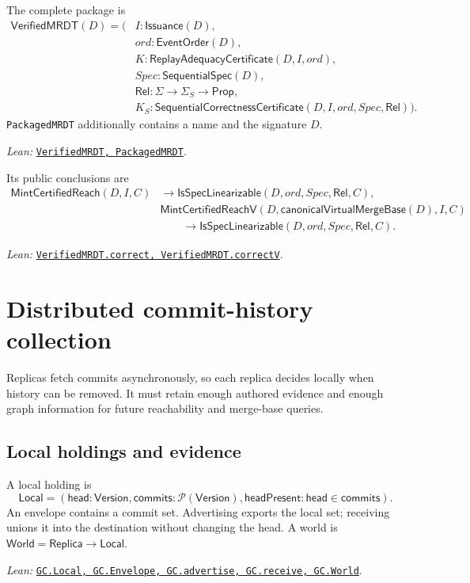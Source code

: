\documentclass[11pt]{article}
\theoremstyle{definition}
\newcommand{\Pow}{\mathcal P}
\newcommand{\State}{\Sigma}
\newcommand{\Replica}{\mathsf{Replica}}
\newcommand{\Version}{\mathsf{Version}}
\newcommand{\lean}[1]{\texttt{#1}}
\newcommand{\src}[2]{\href{../../#1}{\texttt{#2}}}
\newcommand{\anchor}[2]{\par\smallskip\noindent\emph{Lean: }\src{#1}{#2}.}
\begin{document}
The complete package is
\[
\begin{aligned}
 \mathsf{VerifiedMRDT}(D)=(&I:\mathsf{Issuance}(D),\\
 &ord:\mathsf{EventOrder}(D),\\
 &K:\mathsf{ReplayAdequacyCertificate}(D,I,ord),\\
 &\mathit{Spec}:\mathsf{SequentialSpec}(D),\\
 &\mathsf{Rel}:\State\to\State_S\to\mathsf{Prop},\\
 &K_S:\mathsf{SequentialCorrectnessCertificate}
   (D,I,ord,\mathit{Spec},\mathsf{Rel})).
\end{aligned}
\]
\lean{PackagedMRDT} additionally contains a name and the signature $D$.
\anchor{Sal/MRDTs/Metatheory/Correctness.lean}
  {VerifiedMRDT, PackagedMRDT}

Its public conclusions are
\[
\begin{aligned}
 \mathsf{MintCertifiedReach}(D,I,C)&\to
   \mathsf{IsSpecLinearizable}(D,ord,\mathit{Spec},\mathsf{Rel},C),\\
 &\mathsf{MintCertifiedReachV}
   (D,\mathsf{canonicalVirtualMergeBase}(D),I,C)\\
 &\qquad\to
   \mathsf{IsSpecLinearizable}(D,ord,\mathit{Spec},\mathsf{Rel},C).
\end{aligned}
\]
\anchor{Sal/MRDTs/Metatheory/Correctness.lean}
  {VerifiedMRDT.correct, VerifiedMRDT.correctV}

\section{Distributed commit-history collection}
\label{sec:history-gc}

Replicas fetch commits asynchronously, so each replica decides locally when
history can be removed. It must retain enough authored evidence and enough
graph information for future reachability and merge-base queries.

\subsection{Local holdings and evidence}

A local holding is
\[
 \mathsf{Local}=(\mathsf{head}:\Version,
   \mathsf{commits}:\Pow(\Version),
   \mathsf{headPresent}:\mathsf{head}\in\mathsf{commits}).
\]
An envelope contains a commit set. Advertising exports the local set;
receiving unions it into the destination without changing the head. A world is
$\mathsf{World}=\Replica\to\mathsf{Local}$.
\anchor{Sal/MRDTs/GC/Distributed.lean}
  {GC.Local, GC.Envelope, GC.advertise, GC.receive, GC.World}
\end{document}
